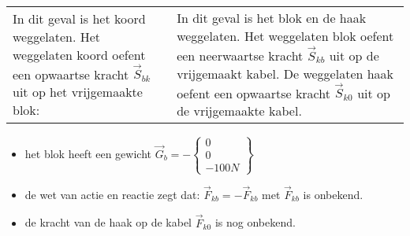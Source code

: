 \documentclass{ximera}
\begin{document}
\begin{question}
\begin{hint}
\begin{hint}
\begin{enumerate}
 \begin{center}
 \begin{tabular}{p{}p{}}
  In dit geval is het koord weggelaten. 
 Het weggelaten koord oefent een opwaartse kracht $\vec S_{bk}$ uit op het vrijgemaakte blok:
%    
&
  In dit geval is het blok en de haak weggelaten. 
 Het weggelaten blok oefent een neerwaartse kracht $\vec S_{kb}$ uit op de vrijgemaakt kabel. 
 De weggelaten haak oefent een opwaartse kracht $\vec S_{k0}$ uit op de vrijgemaakte kabel. 
% 
\end{tabular}
\end{center}
 \begin{itemize}
  \item het blok heeft een gewicht $\vec G_b = -  \left\{\begin{array}{c} 0 \\ 0 \\ -100N \end{array}\right\}$
  \item de wet van actie en reactie zegt dat: $\vec F_{kb} = -\vec F_{kb}  $ met $\vec F_{kb} $ is onbekend.
  \item de kracht van de haak op de kabel $\vec F_{k0}$ is nog onbekend.
 \end{itemize}


\end{enumerate}
\end{hint}
\end{hint}
\end{question}
\end{document}
